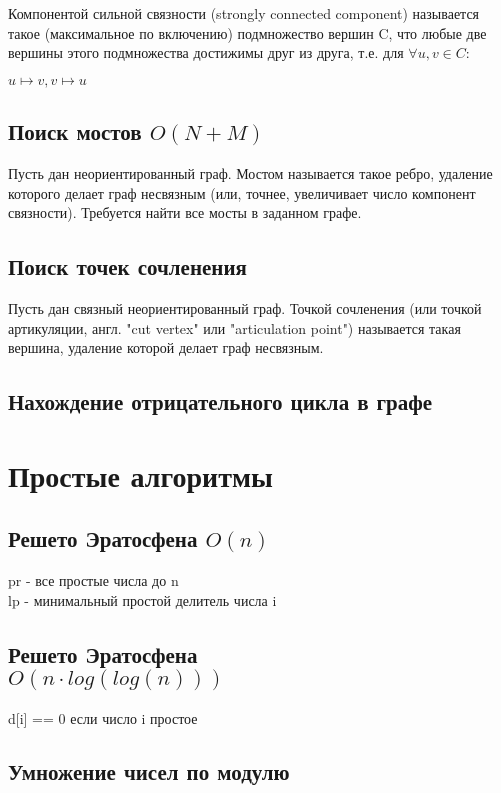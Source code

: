 \documentclass[a4paper]{article}
\begin{document}
\begin{multicols*}{2}
		Компонентой сильной связности (strongly connected component) называется такое (максимальное по включению) подмножество вершин C, что любые две вершины этого подмножества достижимы друг из друга, т.е. для $\forall u,v \in C:$
		
		$u \mapsto v, v \mapsto u $
		
		\subsection{Поиск мостов $O(N+M)$}
		Пусть дан неориентированный граф. Мостом называется такое ребро, удаление которого делает граф несвязным (или, точнее, увеличивает число компонент связности). Требуется найти все мосты в заданном графе.		
		
		\subsection{Поиск точек сочленения}
		Пусть дан связный неориентированный граф. Точкой сочленения (или точкой артикуляции, англ. "cut vertex" или "articulation point") называется такая вершина, удаление которой делает граф несвязным.
		
		\subsection{Нахождение отрицательного цикла в графе}
		
		
		\section{Простые алгоритмы}		
		\subsection{Решето Эратосфена $O(n)$}
		pr - все простые числа до n \\
		lp - минимальный простой делитель числа i
		 
		

		\subsection{Решето Эратосфена \\ $O(n \cdot log(log(n)))$}
		d[i] == 0 если число i простое
		
		\subsection{Умножение чисел по модулю}
		

\end{multicols*}
\end{document}
